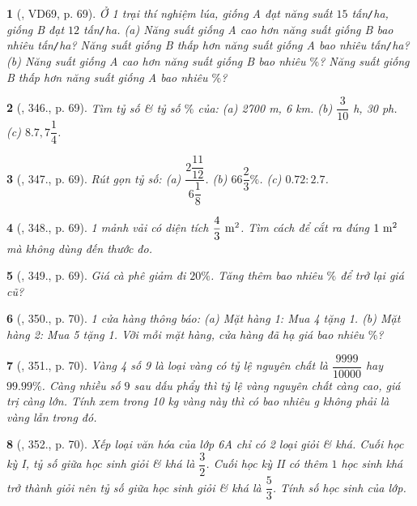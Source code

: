 \documentclass{article}
\newtheorem{baitoan}{}
\begin{document}
\begin{baitoan}[\cite{Tuyen_Toan_6}, VD69, p. 69]
	Ở 1 trại thí nghiệm lúa, giống A đạt năng suất $15$ tấn{\tt/}ha, giống B đạt $12$ tấn{\tt/}ha. (a) Năng suất giống A cao hơn năng suất giống B bao nhiêu tấn{\tt/}ha? Năng suất giống B thấp hơn năng suất giống A bao nhiêu tấn{\tt/}ha? (b) Năng suất giống A cao hơn năng suất giống B bao nhiêu $\%$? Năng suất giống B thấp hơn năng suất giống A bao nhiêu $\%$? 
\end{baitoan}

\begin{baitoan}[\cite{Tuyen_Toan_6}, 346., p. 69]
	Tìm tỷ số \& tỷ số $\%$ của: (a) {\rm2700 m, 6 km}. (b) {\rm $\dfrac{3}{10}$ h, 30 ph}. (c) $8.7,7\dfrac{1}{4}$.
\end{baitoan}

\begin{baitoan}[\cite{Tuyen_Toan_6}, 347., p. 69]
	Rút gọn tỷ số: (a) $\dfrac{2\dfrac{11}{12}}{6\dfrac{1}{8}}$. (b) $66\dfrac{2}{3}\%$. (c) $0.72:2.7$.
\end{baitoan}

\begin{baitoan}[\cite{Tuyen_Toan_6}, 348., p. 69]
	1 mảnh vải có diện tích $\rm\dfrac{4}{3}\ m^2$. Tìm cách để cắt ra đúng $\rm1\ m^2$ mà không dùng đến thước đo.
\end{baitoan}

\begin{baitoan}[\cite{Tuyen_Toan_6}, 349., p. 69]
	Giá cà phê giảm đi $20\%$. Tăng thêm bao nhiêu $\%$ để trở lại giá cũ?
\end{baitoan}

\begin{baitoan}[\cite{Tuyen_Toan_6}, 350., p. 70]
	1 cửa hàng thông báo: (a) Mặt hàng 1: Mua 4 tặng 1. (b) Mặt hàng 2: Mua 5 tặng 1. Vỡi mỗi mặt hàng, cửa hàng đã hạ giá bao nhiêu $\%$?
\end{baitoan}

\begin{baitoan}[\cite{Tuyen_Toan_6}, 351., p. 70]
	Vàng 4 số 9 là loại vàng có tỷ lệ nguyên chất là $\dfrac{9999}{10000}$ hay $99.99\%$. Càng nhiều số $9$ sau dấu phẩy thì tỷ lệ vàng nguyên chất càng cao, giá trị càng lớn. Tính xem trong {\rm10 kg} vàng này thì có bao nhiêu {\rm g} không phải là vàng lẫn trong đó.
\end{baitoan}

\begin{baitoan}[\cite{Tuyen_Toan_6}, 352., p. 70]
	Xếp loại văn hóa của lớp 6A chỉ có 2 loại giỏi \& khá. Cuối học kỳ I, tỷ số giữa học sinh giỏi \& khá là $\dfrac{3}{2}$. Cuối học kỳ II có thêm $1$ học sinh khá trở thành giỏi nên tỷ số giữa học sinh giỏi \& khá là $\dfrac{5}{3}$. Tính số học sinh của lớp.
\end{baitoan}
\end{document}
